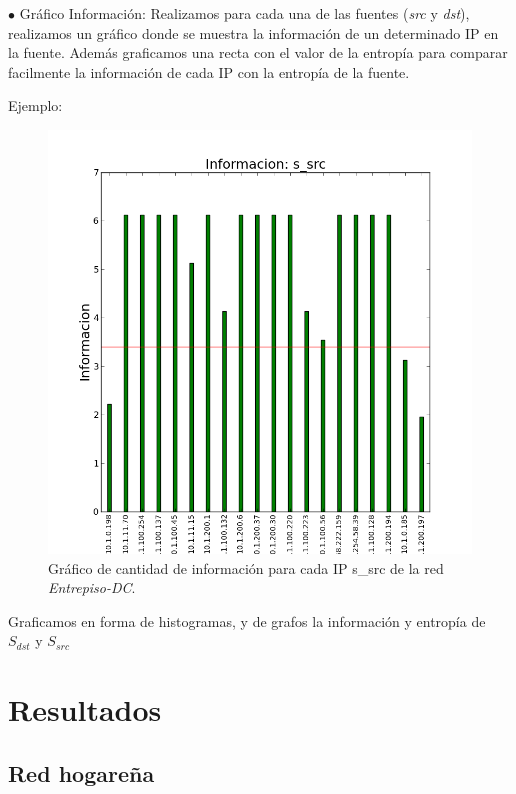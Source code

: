 \documentclass[10pt, a4paper]{article}
\begin{document}
$\bullet$ Gráfico Información:
  Realizamos para cada una de las fuentes (\emph{src} y \emph{dst}), realizamos un gráfico donde se muestra la información de un determinado IP en la fuente. Además graficamos una recta con el valor de la entropía para comparar facilmente la información de cada IP con la entropía de la fuente. 
  
  Ejemplo:
  
  \begin{figure}  
  \begin{center}
    \includegraphics[width=\linewidth/2]{../imgs/entrepiso-dc-ips_s_src_info.png}
    \caption{Gráfico de cantidad de información para cada IP s\_src de la red \emph{Entrepiso-DC}.}
    \label{fig:informacion-entrepiso-dc-s-src}
  \end{center}
\end{figure}
  
Graficamos en forma de histogramas, y de grafos la información y entropía de $S_{dst}$ y $S_{src}$

\section{Resultados}

\subsection{Red hogareña}
\end{document}
